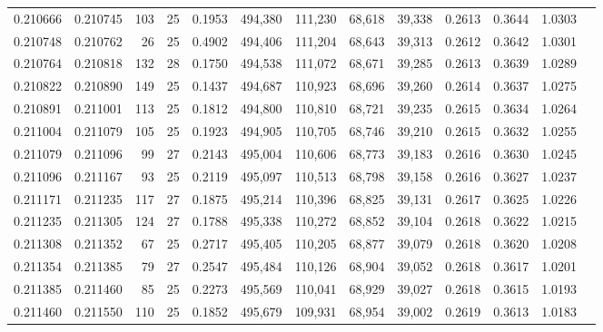 \begin{tabular}{rrrrrrrrrrrrr}
0.210666 & 0.210745 & 103 &  25 &                                     0.1953 & 494,380 & 111,230 &  68,618 &  39,338 & 0.2613 & 0.3644 & 1.0303 \\
0.210748 & 0.210762 &  26 &  25 &                                     0.4902 & 494,406 & 111,204 &  68,643 &  39,313 & 0.2612 & 0.3642 & 1.0301 \\
0.210764 & 0.210818 & 132 &  28 &                                     0.1750 & 494,538 & 111,072 &  68,671 &  39,285 & 0.2613 & 0.3639 & 1.0289 \\
0.210822 & 0.210890 & 149 &  25 &                                     0.1437 & 494,687 & 110,923 &  68,696 &  39,260 & 0.2614 & 0.3637 & 1.0275 \\
0.210891 & 0.211001 & 113 &  25 &                                     0.1812 & 494,800 & 110,810 &  68,721 &  39,235 & 0.2615 & 0.3634 & 1.0264 \\
0.211004 & 0.211079 & 105 &  25 &                                     0.1923 & 494,905 & 110,705 &  68,746 &  39,210 & 0.2615 & 0.3632 & 1.0255 \\
0.211079 & 0.211096 &  99 &  27 &                                     0.2143 & 495,004 & 110,606 &  68,773 &  39,183 & 0.2616 & 0.3630 & 1.0245 \\
0.211096 & 0.211167 &  93 &  25 &                                     0.2119 & 495,097 & 110,513 &  68,798 &  39,158 & 0.2616 & 0.3627 & 1.0237 \\
0.211171 & 0.211235 & 117 &  27 &                                     0.1875 & 495,214 & 110,396 &  68,825 &  39,131 & 0.2617 & 0.3625 & 1.0226 \\
0.211235 & 0.211305 & 124 &  27 &                                     0.1788 & 495,338 & 110,272 &  68,852 &  39,104 & 0.2618 & 0.3622 & 1.0215 \\
0.211308 & 0.211352 &  67 &  25 &                                     0.2717 & 495,405 & 110,205 &  68,877 &  39,079 & 0.2618 & 0.3620 & 1.0208 \\
0.211354 & 0.211385 &  79 &  27 &                                     0.2547 & 495,484 & 110,126 &  68,904 &  39,052 & 0.2618 & 0.3617 & 1.0201 \\
0.211385 & 0.211460 &  85 &  25 &                                     0.2273 & 495,569 & 110,041 &  68,929 &  39,027 & 0.2618 & 0.3615 & 1.0193 \\
0.211460 & 0.211550 & 110 &  25 &                                     0.1852 & 495,679 & 109,931 &  68,954 &  39,002 & 0.2619 & 0.3613 & 1.0183 \\

\end{tabular}
